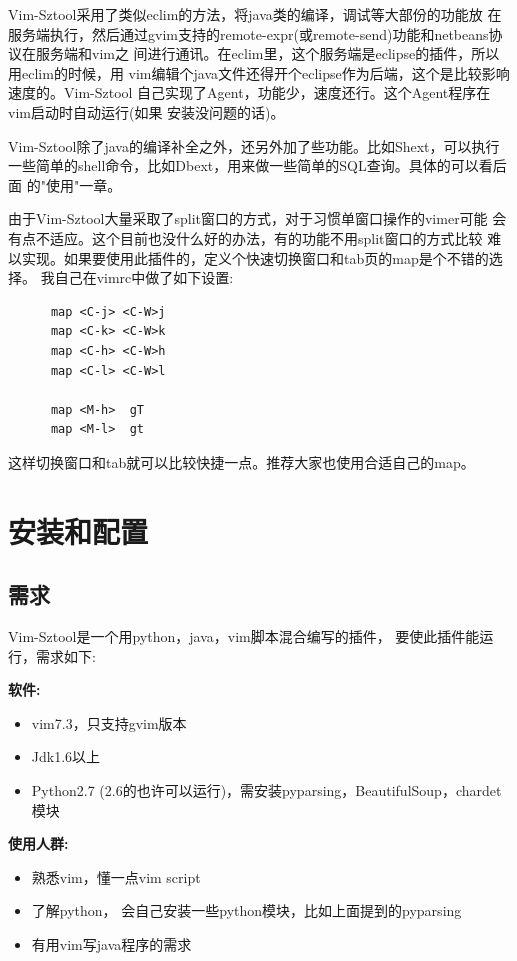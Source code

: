 \documentclass[oneside,openany]{book}
\begin{document}
  Vim-Sztool采用了类似eclim的方法，将java类的编译，调试等大部份的功能放
在服务端执行，然后通过gvim支持的remote-expr(或remote-send)功能和netbeans协议在服务端和vim之
间进行通讯。在eclim里，这个服务端是eclipse的插件，所以用eclim的时候，用
vim编辑个java文件还得开个eclipse作为后端，这个是比较影响速度的。Vim-Sztool
自己实现了Agent，功能少，速度还行。这个Agent程序在vim启动时自动运行(如果
安装没问题的话)。

  Vim-Sztool除了java的编译补全之外，还另外加了些功能。比如Shext，可以执行
一些简单的shell命令，比如Dbext，用来做一些简单的SQL查询。具体的可以看后面
的"使用"一章。

  由于Vim-Sztool大量采取了split窗口的方式，对于习惯单窗口操作的vimer可能
会有点不适应。这个目前也没什么好的办法，有的功能不用split窗口的方式比较
难以实现。如果要使用此插件的，定义个快速切换窗口和tab页的map是个不错的选择。
我自己在vimrc中做了如下设置:

\begin{mdframed}[style=BestPracticeFrame]
    \begin{verbatim}
      map <C-j> <C-W>j
      map <C-k> <C-W>k
      map <C-h> <C-W>h
      map <C-l> <C-W>l

      map <M-h>  gT
      map <M-l>  gt
    \end{verbatim}
\end{mdframed}

这样切换窗口和tab就可以比较快捷一点。推荐大家也使用合适自己的map。


\chapter{安装和配置}
  \section{需求}
  Vim-Sztool是一个用python，java，vim脚本混合编写的插件， 要使此插件能运行，需求如下:

  \textbf{软件:}
    \begin{itemize}
      \item vim7.3，只支持gvim版本
      \item Jdk1.6以上
      \item Python2.7 (2.6的也许可以运行)，需安装pyparsing，BeautifulSoup，chardet模块
    \end{itemize}

  \textbf{使用人群:}
    \begin{itemize}
      \item 熟悉vim，懂一点vim script
      \item 了解python， 会自己安装一些python模块，比如上面提到的pyparsing
      \item 有用vim写java程序的需求
    \end{itemize}
\end{document}
